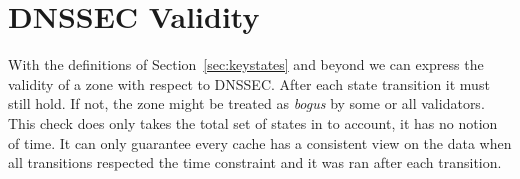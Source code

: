 \documentclass[twoside,english, a4paper]{article}
\begin{document}


\section{DNSSEC Validity} \label{validity}

With the definitions of Section~\ref{sec:keystates} and beyond we can
express the validity of a zone with respect to DNSSEC. After each state
transition it must still hold. If not, the zone might be treated as
\emph{bogus} by some or all validators. This check does only takes the 
total set of states in to account, it has no notion of time. It can
only guarantee every cache has a consistent view on the data when all
transitions respected the time constraint and it was ran after each
transition.
\end{document}

